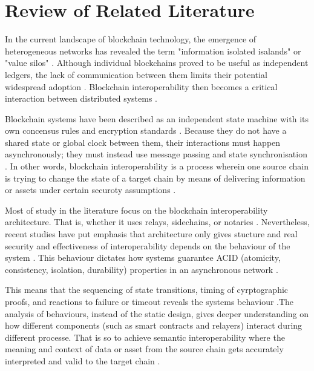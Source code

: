 \chapter{Review of Related
Literature}\label{review-of-related-literature}

In the current landscape of blockchain technology, the emergence of
heterogeneous networks has revealed the term "information isolated
isalands" or "value silos" \citep{wang2021sok} \citep{Bigiotti2025}
\citep{Wu_2023}. Although individual blockchains proved to be useful as
independent ledgers, the lack of communication between them limits their
potential widespread adoption \citep{Hassan_2025} \citep{Cheng_2024}
\citep{Lohachab_2021}. Blockchain interoperability then becomes a
critical interaction between distributed systems \citep{wang2021sok}
\citep{Li2025} \citep{Lohachab_2021}.

Blockchain systems have been described as an independent state machine
with its own concensus rules and encryption standards
\citep{Bigiotti2025} \citep{Belchior_2021}. Because they do not have a
shared state or global clock between them, their interactions must
happen asynchronously; they must instead use message passing and state
synchronisation \citep{wang2021sok} \citep{Wei_2023}. In other words,
blockchain interoperability is a process wherein one source chain is
trying to change the state of a target chain by means of delivering
information or assets under certain securoty assumptions
\citep{wang2021sok} \citep{Wang_2023} \citep{belchior2021survey}.

Most of study in the literature focus on the blockchain interoperability
architecture. That is, whether it uses relays, sidechains, or notaries
\citep{Kotey_2023} \citep{Caetano_da_Silva_2025} \citep{Li_2023}
\citep{Chen_2023}. Nevertheless, recent studies have put emphasis that
architecture only gives stucture and real security and effectiveness of
interoperability depends on the behaviour of the system
\citep{Llambas2025} \citep{Llambas2024eventb} \citep{Lohachab_2021}.
This behaviour dictates how systems guarantee ACID (atomicity,
consistency, isolation, durability) properties in an asynchronous
network \citep{wang2021sok} \citep{Bigiotti2025} \citep{Wang_2023}
\citep{Li2025}.

This means that the sequencing of state transitions, timing of
cyrptographic proofs, and reactions to failure or timeout reveals the
system\textquotesingle s behaviour \citep{Ou_2022}
\citep{Chervinski_2023} \citep{deng2025} \citep{Wei_2023}.The analysis
of behaviours, instead of the static design, gives deeper understanding
on how different components (such as smart contracts and relayers)
interact during different processe. That is so to achieve semantic
interoperability where the meaning and context of data or asset from the
source chain gets accurately interpreted and valid to the target chain
\citep{Belchior_2023} \citep{sottomayor2024enterprise} \citep{Li2025}.

